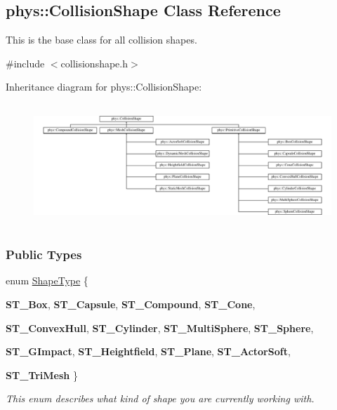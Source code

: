 \hypertarget{classphys_1_1CollisionShape}{
\subsection{phys::CollisionShape Class Reference}
\label{classphys_1_1CollisionShape}
}


This is the base class for all collision shapes.  




{\ttfamily \#include $<$collisionshape.h$>$}

Inheritance diagram for phys::CollisionShape:\begin{figure}[H]
\begin{center}
\leavevmode
\includegraphics[height=4.645161cm]{classphys_1_1CollisionShape}
\end{center}
\end{figure}
\subsubsection*{Public Types}
\begin{DoxyCompactItemize}
\item 
enum \hyperlink{classphys_1_1CollisionShape_af3ba4fd8af5b9557f912d2f5ff35a588}{ShapeType} \{ \par
{\bfseries ST\_\-Box}, 
{\bfseries ST\_\-Capsule}, 
{\bfseries ST\_\-Compound}, 
{\bfseries ST\_\-Cone}, 
\par
{\bfseries ST\_\-ConvexHull}, 
{\bfseries ST\_\-Cylinder}, 
{\bfseries ST\_\-MultiSphere}, 
{\bfseries ST\_\-Sphere}, 
\par
{\bfseries ST\_\-GImpact}, 
{\bfseries ST\_\-Heightfield}, 
{\bfseries ST\_\-Plane}, 
{\bfseries ST\_\-ActorSoft}, 
\par
{\bfseries ST\_\-TriMesh}
 \}
\begin{DoxyCompactList}\small\item\em This enum describes what kind of shape you are currently working with. \item\end{DoxyCompactList}\end{DoxyCompactItemize}
